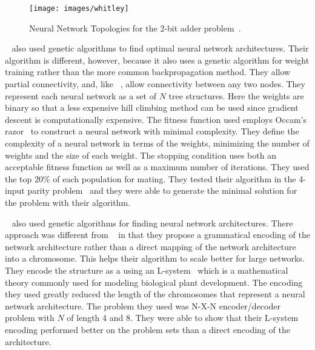 \begin{figure}[htb!]
  \centering
  \texttt{[image: images/whitley]}
  \caption{Neural Network Topologies for the 2-bit
    adder problem~\cite{whitley}.}
  \label{whitley1}
\end{figure}  

~\cite{zhang} also used genetic algorithms to find optimal neural
network architectures. 
Their algorithm is different, however, because it also uses a genetic
algorithm for weight training rather than the more common
backpropagation method.
They allow partial connectivity, and, like ~\cite{whitley}, allow connectivity between any two nodes.
They represent each neural network as a set of $N$ tree structures.
Here the weights are binary so that a less expensive hill climbing
method can be used since gradient descent is computationally
expensive.
The fitness function used employs Occam's razor~\cite{occamsRazor} to construct a neural
network with minimal complexity.
They define the complexity of a neural network in terms of the
weights, minimizing the number of weights and the size of each weight.
The stopping condition uses both an acceptable fitness function as
well as a maximum number of iterations.
They used the top $20\%$ of each population for mating.
They tested their algorithm in the 4-input parity problem~\cite{4bit} and they
were able to generate the minimal solution for the problem with their
algorithm.

~\cite{kitano} also used genetic algorithms for finding neural network
architectures.
There approach was different from ~\cite{whitley} in
that they propose a grammatical encoding of the network architecture
rather than a direct mapping of the network architecture into a
chromosome.
This helps their algorithm to scale better for large networks.
They encode the structure as a using an L-system~\cite{lSystem} which
is a mathematical theory commonly used for modeling biological plant
development.
The encoding they used greatly reduced the length of the chromosomes
that represent a neural network architecture.
The problem they used was N-X-N encoder/decoder
problem with $N$ of length 4 and 8. 
They were able to show that their L-system encoding performed better
on the problem sets than a direct encoding of the architecture.









 

